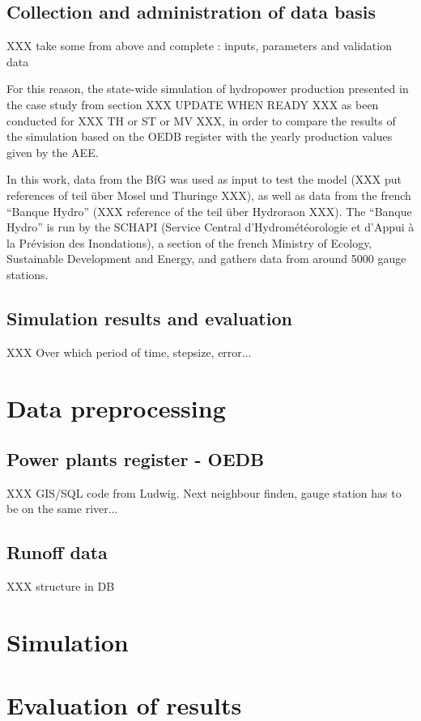 \subsection{Collection and administration of data basis}


XXX take some from above and complete : inputs, parameters and validation data

For this reason, the state-wide simulation of hydropower production presented in the case study from section XXX UPDATE WHEN READY XXX as been conducted for XXX TH or ST or MV XXX, in order to compare the results of the simulation based on the OEDB register with the yearly production values given by the AEE.

In this work, data from the BfG was used as input to test the model (XXX put references of teil über Mosel und Thuringe XXX), as well as data from the french ``Banque Hydro'' (XXX reference of the teil über Hydroraon XXX). The ``Banque Hydro'' is run by the SCHAPI (Service Central d'Hydrométéorologie et d'Appui à la Prévision des Inondations), a section of the french Ministry of Ecology, Sustainable Development and Energy, and gathers data from around 5000 gauge stations.


\subsection{Simulation results and evaluation}
XXX Over which period of time, stepsize, error...

\section{Data preprocessing}

\subsection{Power plants register - OEDB}
XXX GIS/SQL code from Ludwig. Next neighbour finden, gauge station has to be on the same river...
\subsection{Runoff data}
XXX structure in DB

\section{Simulation}

\section{Evaluation of results}

